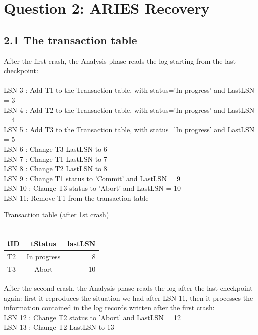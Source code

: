 \documentclass[paper=a4, fontsize=11pt]{scrartcl} %
\numberwithin{equation}{section} %
\numberwithin{figure}{section} %
\numberwithin{table}{section} %
\begin{document}
\clearpage
\section{Question 2: ARIES Recovery}

\subsection{2.1 The transaction table}

After the first crash, the Analysis phase reads the log starting from the last checkpoint:\\
~\\
LSN 3 : Add T1 to the Transaction table, with status='In progress' and LastLSN = 3\\
LSN 4 : Add T2 to the Transaction table, with status='In progress' and LastLSN = 4\\
LSN 5 : Add T3 to the Transaction table, with status='In progress' and LastLSN = 5\\
LSN 6 : Change T3 LastLSN to 6\\
LSN 7 : Change T1 LastLSN to 7\\
LSN 8 : Change T2 LastLSN to 8\\
LSN 9 : Change T1 status to 'Commit' and LastLSN = 9\\
LSN 10 : Change T3 status to 'Abort' and LastLSN = 10\\
LSN 11: Remove T1 from the transaction table\\

\begin{center}
  Transaction table (after 1st crash)\\~\\
  \begin{tabular}{ l | c | r }
    \hline
    \textbf{tID} & \textbf{tStatus} & \textbf{lastLSN} \\ \hline
    T2 & In progress & 8 \\ \hline
    T3 & Abort & 10 \\
    \hline
  \end{tabular}
\end{center}

After the second crash, the Analysis phase reads the log after the last checkpoint again: first it reproduces the situation we had after LSN 11, then it processes the information contained in the log records written after the first crash:\\
LSN 12 : Change T2 status to 'Abort' and LastLSN = 12\\
LSN 13 : Change T2 LastLSN to 13\\
\end{document}
